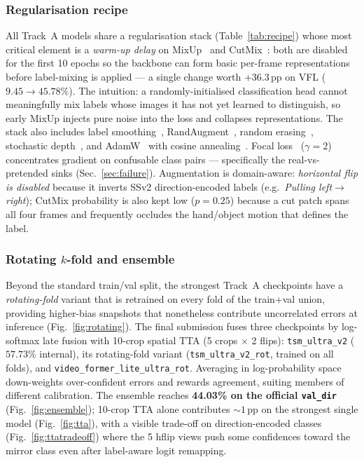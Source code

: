 \documentclass[10pt,twocolumn,letterpaper]{article}
\begin{document}
\subsubsection{Regularisation recipe}
All Track~A models share a regularisation stack (Table~\ref{tab:recipe}) whose
most critical element is a \emph{warm-up delay} on
MixUp~\cite{zhang2018mixup} and CutMix~\cite{yun2019cutmix}: both are disabled
for the first 10 epochs so the backbone can form basic per-frame
representations before label-mixing is applied --- a single change worth
$+36.3$\,pp on VFL ($9.45\!\rightarrow\!45.78\%$). The intuition: a
randomly-initialised classification head cannot meaningfully mix labels whose
images it has not yet learned to distinguish, so early MixUp injects pure noise
into the loss and collapses representations.
The stack also includes label smoothing~\cite{muller2019labelsmooth},
RandAugment~\cite{cubuk2020randaugment},
random erasing~\cite{zhong2020randomerase}, stochastic
depth~\cite{huang2016stochdepth}, and AdamW~\cite{loshchilov2019adamw} with
cosine annealing~\cite{loshchilov2017sgdr}. Focal loss~\cite{lin2017focal}
($\gamma{=}2$) concentrates gradient on confusable class pairs --- specifically
the real-vs-pretended sinks (Sec.~\ref{sec:failure}). Augmentation is
domain-aware: \emph{horizontal flip is disabled} because it inverts SSv2
direction-encoded labels (e.g.\ \emph{Pulling left$\rightarrow$right}); CutMix
probability is also kept low ($p{=}0.25$) because a cut patch spans all four
frames and frequently occludes the hand/object motion that defines the label.

\subsubsection{Rotating $k$-fold and ensemble}
Beyond the standard train/val split, the strongest Track~A checkpoints have a
\emph{rotating-fold} variant that is retrained on every fold of the train+val
union, providing higher-bias snapshots that nonetheless contribute
uncorrelated errors at inference (Fig.~\ref{fig:rotating}). The final
submission fuses three checkpoints by log-softmax late fusion with 10-crop
spatial TTA (5 crops $\times$ 2 flips):
\texttt{tsm\_ultra\_v2} ($57.73\%$ internal), its rotating-fold variant
(\texttt{tsm\_ultra\_v2\_rot}, trained on all folds), and
\texttt{video\_former\_lite\_ultra\_rot}. Averaging in log-probability space
down-weights over-confident errors and rewards agreement, suiting members of
different calibration. The ensemble reaches \textbf{44.03\% on the official
\texttt{val\_dir}} (Fig.~\ref{fig:ensemble}); 10-crop TTA alone contributes
${\sim}1$\,pp on the strongest single model (Fig.~\ref{fig:tta}), with a
visible trade-off on direction-encoded classes
(Fig.~\ref{fig:ttatradeoff}) where the 5 hflip views push some confidences
toward the mirror class even after label-aware logit remapping.
\end{document}
